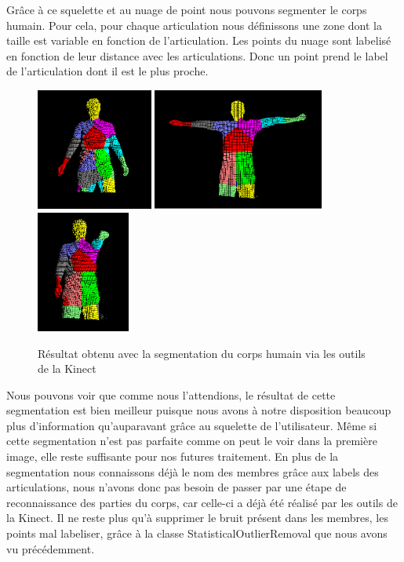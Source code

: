 Grâce à ce squelette et au nuage de point nous pouvons segmenter le corps humain. Pour cela, pour chaque articulation nous définissons une zone
dont la taille est variable en fonction de l'articulation. Les points du nuage sont labelisé en fonction de leur distance avec les articulations.
Donc un point prend le label de l'articulation dont il est le plus proche.\\

\begin{figure}[!ht]
  \begin{center}
    \includegraphics[height=4cm]{image/lab1.PNG} 
    \includegraphics[height=4cm]{image/lab2.PNG}
    \includegraphics[height=4cm]{image/lab3.PNG}
    \caption{Résultat obtenu avec la segmentation du corps humain via les outils de la Kinect}
  \end{center}
\end{figure}

Nous pouvons voir que comme nous l'attendions, le résultat de cette segmentation est bien meilleur puisque nous avons à notre disposition
beaucoup plus d'information qu'auparavant grâce au squelette de l'utilisateur. Même si cette segmentation n'est pas parfaite comme on peut
le voir dans la première image, elle reste suffisante pour nos futures traitement. En plus de la segmentation nous connaissons déjà le nom
des membres grâce aux labels des articulations, nous n'avons donc pas besoin de passer par une étape de reconnaissance des parties du
corps, car celle-ci a déjà été réalisé par les outils de la Kinect. Il ne reste plus qu'à supprimer le bruit présent dans les membres, les points
mal labeliser, grâce à la classe StatisticalOutlierRemoval que nous avons vu précédemment.

